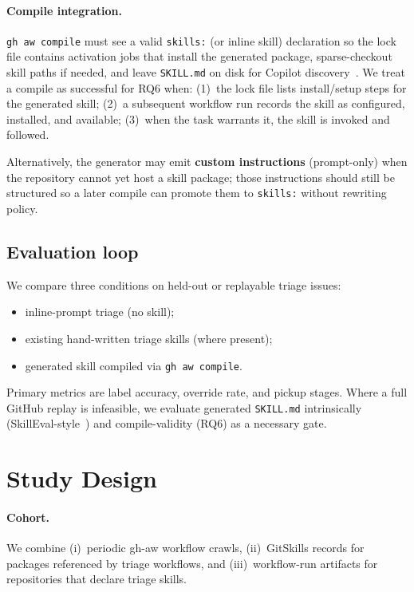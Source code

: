 \documentclass[sigconf,review,anonymous]{acmart}
\begin{document}
\paragraph{Compile integration.}
\texttt{gh aw compile} must see a valid \texttt{skills:} (or inline skill)
declaration so the lock file contains activation jobs that install the generated
package, sparse-checkout skill paths if needed, and leave \texttt{SKILL.md} on
disk for Copilot discovery~\cite{ghawSkillsGuide2026}.
We treat a compile as successful for RQ6 when:
(1)~the lock file lists install/setup steps for the generated skill;
(2)~a subsequent workflow run records the skill as configured, installed, and
available;
(3)~when the task warrants it, the skill is invoked and followed.

Alternatively, the generator may emit \textbf{custom instructions} (prompt-only)
when the repository cannot yet host a skill package; those instructions should
still be structured so a later compile can promote them to \texttt{skills:}
without rewriting policy.

\subsection{Evaluation loop}
We compare three conditions on held-out or replayable triage issues:
\begin{itemize}
  \item inline-prompt triage (no skill);
  \item existing hand-written triage skills (where present);
  \item generated skill compiled via \texttt{gh aw compile}.
\end{itemize}
Primary metrics are label accuracy, override rate, and pickup stages.
Where a full GitHub replay is infeasible, we evaluate generated
\texttt{SKILL.md} intrinsically (SkillEval-style~\cite{skilleval2026}) and
compile-validity (RQ6) as a necessary gate.

\section{Study Design}
\label{sec:study-design}

\paragraph{Cohort.}
We combine (i)~periodic gh-aw workflow crawls, (ii)~GitSkills records for
packages referenced by triage workflows, and (iii)~workflow-run artifacts for
repositories that declare triage skills.
\end{document}
